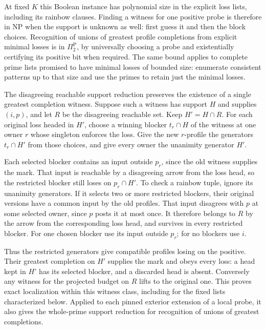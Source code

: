 At fixed $K$ this Boolean instance has polynomial size in the
explicit loss lists, including its rainbow clauses. Finding a
witness for one positive probe is therefore in NP when the
support is unknown as well: first guess it and then the block
choices. Recognition of unions of greatest profile completions
from explicit minimal losses is in $\Pi_2^{\mathrm P}$, by
universally choosing a probe and existentially certifying its
positive bit when required. The same bound applies to complete
prime lists promised to have minimal losses of bounded size:
enumerate consistent patterns up to that size and use the
primes to retain just the minimal losses.

The disagreeing reachable support reduction preserves
the existence of a single greatest completion witness.
Suppose such a witness has support $H$ and supplies
$(i,p)$, and let $R$ be the disagreeing reachable set.
Keep $H'=H\cap R$. For each original loss headed in
$H'$, choose a winning blocker $t_r\cap H$ of the
witness at one owner $r$ whose singleton enforces
the loss. Give the new $r$-profile the generators
$t_r\cap H'$ from those choices, and give every
owner the unanimity generator $H'$.

Each selected blocker contains an input outside
$p_r$, since the old witness supplies the mark.
That input is reachable by a disagreeing arrow
from the loss head, so the restricted blocker
still loses on $p_r\cap H'$. To check a rainbow
tuple, ignore its unanimity generators. If it
selects two or more restricted blockers, their
original versions have a common input by the
old profiles. That input disagrees with $p$ at
some selected owner, since $p$ posts it at most
once. It therefore belongs to $R$ by the arrow
from the corresponding loss head, and survives
in every restricted blocker. For one chosen
blocker use its input outside $p_r$; for no
blockers use $i$.

Thus the restricted generators give compatible
profiles losing on the positive. Their greatest
completion on $H'$ supplies the mark and obeys
every loss: a head kept in $H'$ has its selected
blocker, and a discarded head is absent. Conversely
any witness for the projected budget on $R$ lifts
to the original one. This proves exact localization
within this witness class, including for the fixed
lists characterized below. Applied to each pinned
exterior extension of a local probe, it also gives
the whole-prime support reduction for recognition
of unions of greatest completions.

